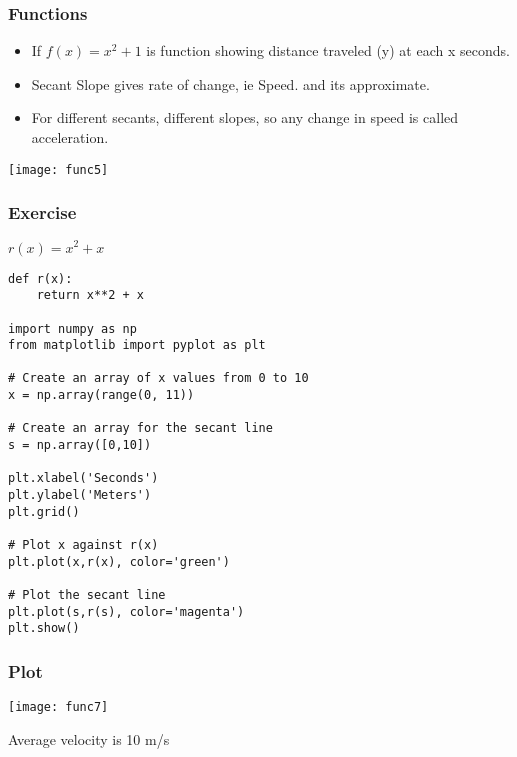  \begin{frame}[fragile]\frametitle{Functions}
\begin{itemize}
\item If $f(x) = x^2 + 1$ is function showing distance traveled (y) at each x seconds.
\item Secant Slope gives rate of change, ie Speed. and its approximate.
\item For different secants, different slopes, so any change in speed is called acceleration.
\end{itemize}
\begin{center}
\texttt{[image: func5]}
\end{center}
\end{frame}


 \begin{frame}[fragile]\frametitle{Exercise}
$r(x) = x^2 + x$

\begin{lstlisting}
def r(x):
    return x**2 + x

import numpy as np
from matplotlib import pyplot as plt

# Create an array of x values from 0 to 10
x = np.array(range(0, 11))

# Create an array for the secant line
s = np.array([0,10])

plt.xlabel('Seconds')
plt.ylabel('Meters')
plt.grid()

# Plot x against r(x)
plt.plot(x,r(x), color='green')

# Plot the secant line
plt.plot(s,r(s), color='magenta')
plt.show()
\end{lstlisting}
\end{frame}


 \begin{frame}[fragile]\frametitle{Plot}
\begin{center}
\texttt{[image: func7]}
\end{center}
Average velocity is 10 m/s
\end{frame}

